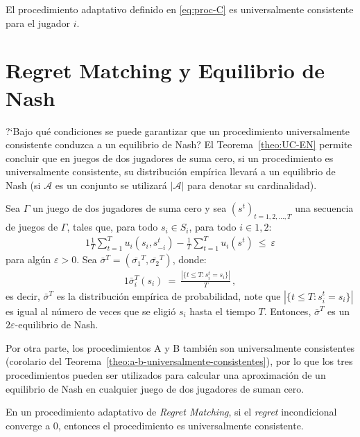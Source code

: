 \begin{theorem}
\label{theo:conv-proc-C}
El procedimiento adaptativo definido en \eqref{eq:proc-C} es universalmente consistente para el jugador $i$.
\end{theorem}

\section{Regret Matching y Equilibrio de Nash}

?`Bajo qué condiciones se puede garantizar que un procedimiento universalmente consistente conduzca a un equilibrio de Nash? El Teorema~\ref{theo:UC-EN} permite concluir que en juegos de dos jugadores de suma cero, si un procedimiento es universalmente consistente, su distribución empírica llevará a un equilibrio de Nash (si $\mathcal{A}$ es un conjunto se utilizará $|\mathcal{A}|$ para denotar su cardinalidad).

\begin{theorem}
\label{theo:UC-EN}
Sea $\Gamma$ un juego de dos jugadores de suma cero y sea $(s^t)_{t=1,2,..., T}$ una secuencia de juegos de $\Gamma$, tales que, para todo $s_i \in S_i$, para todo $i \in {1, 2}$:
\begin{alignat}{1}
\frac{1}{T}\sum_{t = 1}^{T}u_i(s_i, s_{-i}^t) - \frac{1}{T} \sum_{t = 1}^T u_i(s^t)\ \leq\ \varepsilon
\end{alignat}
para algún $\varepsilon > 0$. Sea $\bar{\sigma}^T = (\bar{\sigma_1}^T, \bar{\sigma_2}^T)$, donde:
\begin{alignat}{1}
\bar{\sigma}_i^T(s_i)\ =\ \frac{|\{ t \leq T : s_i^t = s_i\}|}{T} \,,
\end{alignat}
es decir, $\bar{\sigma}^T$ es la distribución empírica de probabilidad, note que $|\{ t \leq T : s_i^t = s_i\}|$ es igual al número de veces que se eligió $s_i$ hasta el tiempo $T$. Entonces, $\bar{\sigma}^T$ es un $2\varepsilon$-equilibrio de Nash.
\end{theorem}

Por otra parte, los procedimientos A y B también son universalmente consistentes (corolario del Teorema~\ref{theo:a-b-universalmente-consistentes}), por lo que los tres procedimientos pueden ser utilizados para calcular una aproximación de un equilibrio de Nash en cualquier juego de dos jugadores de suman cero.

\begin{theorem}
\label{theo:a-b-universalmente-consistentes}
En un procedimiento adaptativo de \textit{Regret Matching}, si el \textit{regret} incondicional converge a $0$, entonces el procedimiento es universalmente consistente.
\end{theorem}

